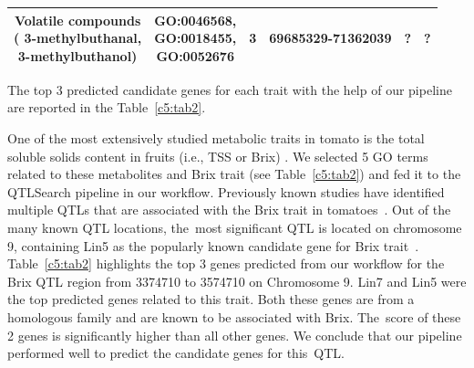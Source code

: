 \documentclass[applsci,article,accept,moreauthors,pdftex]{Definitions/mdpi}
\begin{document}
{\begin{table}[H]
{{{\begin{tabular}{c  c  c  c  c  c }
\midrule
\makecell{Volatile compounds\\ ( 3-methylbuthanal, \\3-methylbuthanol)} & \makecell{GO:0046568, \\ GO:0018455, \\ GO:0052676} & 3 & 69685329-71362039 & ? & ?\\ %
\bottomrule
\end{tabular}}
}
}
\end{table}

The top 3 predicted candidate genes for each trait with the help of our pipeline are reported in the Table~\ref{c5:tab2}. 

One of the most extensively studied metabolic traits in tomato is the total soluble solids content in fruits (i.e., TSS or Brix) \cite{fridman2002two}. We selected 5 GO terms related to these metabolites and Brix trait (see Table~\ref{c5:tab2}) and fed it to the QTLSearch pipeline in our workflow. Previously known studies have identified multiple QTLs that are associated with the Brix trait in tomatoes~\cite{haggard2015multiple}. Out of the many known QTL locations, the~most significant QTL is located on chromosome 9, containing Lin5 as the popularly known candidate gene for Brix trait~\cite{fridman2002two}. Table~\ref{c5:tab2} highlights the top 3 genes predicted from our workflow for the Brix QTL region from 3374710 to 3574710 on Chromosome 9. Lin7 and Lin5 were the top predicted genes related to this trait. Both these genes are from a homologous family and are known to be associated with Brix. The~score of these 2 genes is significantly higher than all other genes. We conclude that our pipeline performed well to predict the candidate genes for this~QTL. 

}
\end{document}
